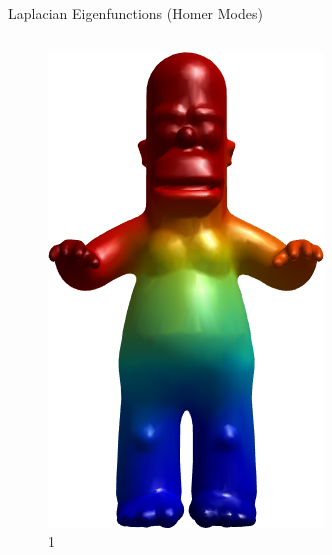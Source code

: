 \documentclass{beamer}
\begin{document}
\begin{frame}{Laplacian Eigenfunctions (Homer Modes)}
\begin{columns}
\begin{column}[T]{3cm}
\begin{figure}[t]
    \includegraphics[width=\textwidth]{../23_Spectral/Harmonics/HomerModes/1.png}
    \caption*{\huge 1}
\end{figure}
\end{column}
\begin{column}[T]{3cm}
\begin{figure}[t]

\end{figure}
\end{column}
\end{columns}
\end{frame}
\end{document}
